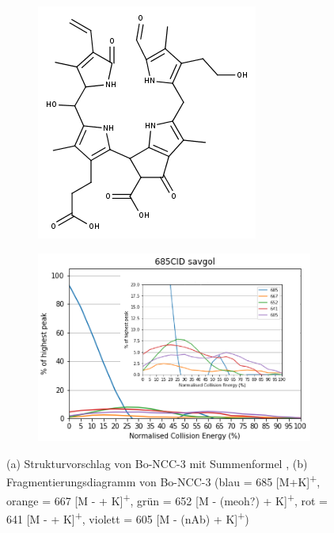 \begin{figure}[!htbp]
  \begin{subfigure}[b]{0.4\textwidth}
    \includegraphics[width=\textwidth]{figures/Kapitel4/Kataboliten/fragmentation_structures/VWA_Katabolit_685.png}
    \caption{}
    \label{fig:685MKLeafspraystructure}
  \end{subfigure}
  \hfill
  \begin{subfigure}[b]{0.7\textwidth}
    \includegraphics[width=\textwidth]{figures/Kapitel4/Kataboliten/diags/685CID-savgol.png}
    \caption{}
    \label{fig:685MKLeafspraydiags}
  \end{subfigure}
  \caption[Strukturvorschlag von Bo-NCC-3 und Fragmentierungsdiagramm, Quelle: Autor]{(a) Strukturvorschlag von Bo-NCC-3 mit Summenformel , (b) Fragmentierungsdiagramm von Bo-NCC-3 (blau = 685 [M+K]\textsuperscript{+}, orange = 667 [M -  + K]\textsuperscript{+}, grün = 652 [M - (\gls{meoh}?) + K]\textsuperscript{+}, rot = 641 [M -  + K]\textsuperscript{+}, violett = 605 [M - (\gls{nAb}) + K]\textsuperscript{+})}
\end{figure}


